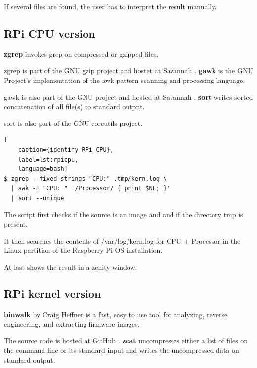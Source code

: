 If several files are found, the user has to interpret the result manually.

\subsection{RPi CPU version}

\textbf{zgrep} invokes grep on compressed or gzipped files.

zgrep is part of the GNU gzip project and hostet at Savannah \cite{Gzip}.\newline
\newline
\noindent \textbf{gawk} is the GNU Project's implementation of the awk pattern scanning and processing language.

gawk is also part of the GNU project and hosted at Savannah \cite{Gawk}.\newline
\newline
\noindent \textbf{sort} writes sorted concatenation of all file(s) to standard output.

sort is also part of the GNU coreutils project.

\begin{lstlisting}[
    caption={identify RPi CPU},
    label=lst:rpicpu,
    language=bash]
$ zgrep --fixed-strings "CPU:" .tmp/kern.log \
  | awk -F "CPU: " '/Processor/ { print $NF; }'
  | sort --unique
\end{lstlisting}

\noindent The script first checks if the source is an image and and if the directory tmp is present.

It then searches the contents of /var/log/kern.log for CPU + Processor in the Linux partition of the Raspberry Pi OS installation.

At last shows the result in a zenity window.

\subsection{RPi kernel version}

\textbf{binwalk} by Craig Heffner is a fast, easy to use tool for analyzing, reverse engineering, and extracting firmware images.

The source code is hosted at GitHub \cite{Binwalk}.\newline
\newline
\noindent \textbf{zcat} uncompresses either a list of files on the command line or its standard input and writes the uncompressed data on standard output.


